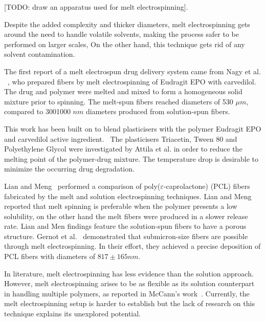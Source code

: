 \documentclass[5p,,preprint,12pt,twocolumn]{elsarticle}
\begin{document}
[TODO: draw an apparatus used for melt electrospinning].

Despite the added complexity and thicker diameters, melt electrospinning  gets around the need to handle volatile solvents, making the process safer to be performed on larger scales, On the other hand, this technique gets rid of any solvent contamination.

The first report of a melt electrospun drug delivery system came from Nagy et al. \unskip~\cite{527120:13445555}, who prepared fibers by melt electrospinning of Eudragit EPO with carvedilol. The drug and polymer were melted and mixed to form a homogeneous solid mixture prior to spinning. The melt-spun fibers reached diameters of 5{\textendash}30 $\mu m $, compared to 300{\textendash}1000 $nm $ diameters produced from solution-spun fibers. 

This work has been built on to blend plasticisers with the polymer Eudragit EPO and carvedilol active ingredient.\unskip~\cite{527120:13445752} The plasticisers Triacetin, Tween 80 and Polyethylene Glycol were investigated by Attila et al. in order to reduce the melting point of the polymer-drug mixture. The temperature drop is desirable to minimize the occurring drug degradation.

Lian and Meng\unskip~\cite{527120:13445754} performed a comparison of poly(\ensuremath{\varepsilon }-caprolactone) (PCL) fibers fabricated by the melt and solution electrospinning techniques. Lian and Meng\unskip~\cite{527120:13445754} reported that melt spinning is preferable when the polymer presents a low solubility, on the other hand the melt fibers were produced in a slower release rate.  Lian and Men findings feature the solution-spun fibers to have a porous structure. Gernot et al.\unskip~\cite{527120:13534159} demonstrated that submicron-size fibers are possible through melt electrospinning. In their effort, they achieved a precise deposition of PCL fibers with diameters of $817 \pm 165 nm $. 

In literature, melt electrospinning has less evidence than the solution approach. However, melt electrospinning arises to be as flexible as its solution counterpart in handling multiple polymers, as reported in McCann's work\unskip~\cite{527120:13534572}. Currently, the melt electrospinning setup is harder to establish but the lack of research on this technique explains its unexplored potential.
\end{document}
